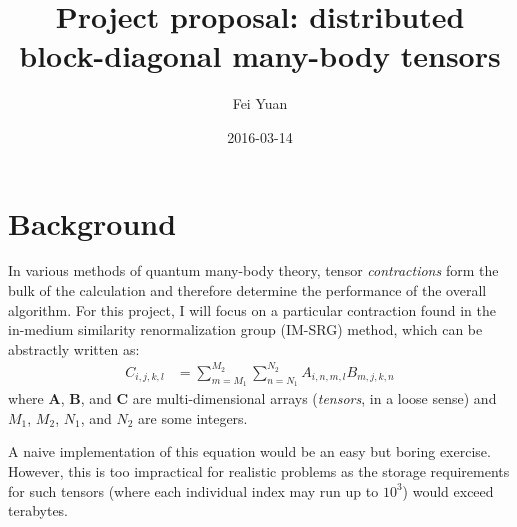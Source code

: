 \documentclass[fleqn, 12pt]{article}
\begin{document}
\title{Project proposal: distributed block-diagonal many-body tensors}
\date{2016-03-14}
\author{Fei Yuan}
\maketitle

\section{Background}

In various methods of quantum many-body theory, tensor \textit{contractions} form the bulk of the calculation and therefore determine the performance of the overall algorithm.  For this project, I will focus on a particular contraction found in the in-medium similarity renormalization group (IM-SRG) method, which can be abstractly written as:
\begin{align}
  C_{i, j, k, l}
  &= \sum_{m = M_1}^{M_2} \sum_{n = N_1}^{N_2} A_{i, n, m, l} B_{m, j, k, n}
    \label{eq:a}
\end{align}
where $\bm A$, $\bm B$, and $\bm C$ are multi-dimensional arrays (\textit{tensors}, in a loose sense) and $M_1$, $M_2$, $N_1$, and $N_2$ are some integers.

A naive implementation of this equation would be an easy but boring exercise.  However, this is too impractical for realistic problems as the storage requirements for such tensors (where each individual index may run up to $10^3$) would exceed terabytes.
\end{document}
